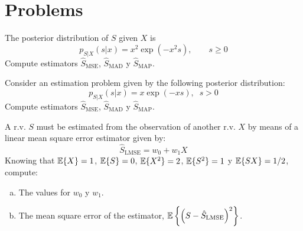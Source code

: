 
\section{Problems}

\begin{prob}
\label{MAPmulticlas1}

The posterior distribution of $S$ given $X$ is 
\[p_{S|X}(s|x) = x^2 \exp(-x^2 s), \qquad s\ge 0
\]
Compute estimators $\hat{S}_{\text{MSE}}$, $\hat{S}_{\text{MAD}}$ y $\hat{S}_{\text{MAP}}$.

\end{prob}


\begin{prob}
\label{ProbSexponencial}

Consider an estimation problem given by the following posterior distribution:
\begin{equation}
p_{S|{X}}(s|{x}) = x \exp({-x s}),\;\; s>0
\end{equation}
Compute estimators $\hat{S}_{\text{MSE}}$, $\hat{S}_{\text{MAD}}$ y $\hat{S}_{\text{MAP}}$.

\end{prob}


\begin{prob}
\label{ProbEstLMSE}

A r.v. $S$ must be estimated from the observation of another r.v. $X$ by means of a linear mean square error estimator given by:
\[\hat S_{\text{LMSE}} = w_0 + w_1 X \]
Knowing that $\mathbb{E} \lbrace X \rbrace= 1$, $\mathbb{E} \lbrace S \rbrace= 0$, $\mathbb{E} \lbrace X^2 \rbrace= 2$, $\mathbb{E} \lbrace S^2 \rbrace= 1$ y $\mathbb{E} \lbrace SX \rbrace= 1/2$, compute:
\begin{enumerate}[a)]
\item The values for $w_0$ y $w_1$.
\item The mean square error of the estimator, $\mathbb{E} \left\lbrace  \left( S-\hat S_{\text{LMSE}}\right)^2 \right\rbrace$.
\end{enumerate}

\end{prob}

